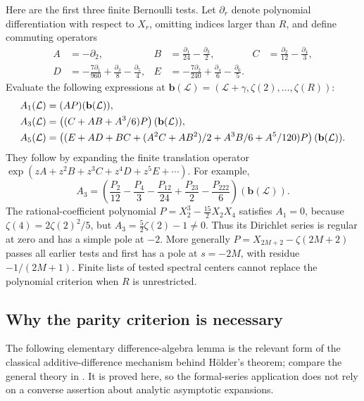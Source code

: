 Here are the first three finite Bernoulli tests. Let $\partial_r$
denote polynomial differentiation with respect to $X_r$, omitting
indices larger than $R$, and define commuting operators
\begin{align*}
 A&=-\partial_2,&
 B&=\frac{\partial_1}{24}-\frac{\partial_3}{2},&
 C&=\frac{\partial_2}{12}-\frac{\partial_4}{3},\\
 D&=-\frac{7\partial_1}{960}+\frac{\partial_3}{8}
                    -\frac{\partial_5}{4},&
 E&=-\frac{7\partial_2}{240}+\frac{\partial_4}{6}
                    -\frac{\partial_6}{5}.
\end{align*}
Evaluate the following expressions at
$\mathbf b(\mathcal L)=(\mathcal L+\gamma,\zeta(2),\ldots,\zeta(R))$:
\begin{align}
 A_1(\mathcal L)&=(AP)(\mathbf b(\mathcal L)),\notag\\
 A_3(\mathcal L)&=\left((C+AB+A^3/6)P\right)(\mathbf b(\mathcal L)),\label{hc:first-tests}\\
 A_5(\mathcal L)&=\left((E+AD+BC+(A^2C+AB^2)/2
                   +A^3B/6+A^5/120)P\right)(\mathbf b(\mathcal L)).\notag
\end{align}
They follow by expanding the finite translation operator
$\exp(zA+z^2B+z^3C+z^4D+z^5E+\cdots)$.
For example,
\[
 A_3=\left(\frac{P_2}{12}-\frac{P_4}{3}
   -\frac{P_{12}}{24}+\frac{P_{23}}2-\frac{P_{222}}6\right)(\mathbf b(\mathcal L)).
\]
The rational-coefficient polynomial
$P=X_2^3-\tfrac{15}{2}X_2X_4$ satisfies $A_1=0$, because
$\zeta(4)=2\zeta(2)^2/5$, but
$A_3=\tfrac52\zeta(2)-1\ne0$. Thus its Dirichlet series is regular
at zero and has a simple pole at $-2$. More generally
$P=X_{2M+2}-\zeta(2M+2)$ passes all earlier tests and first has a
pole at $s=-2M$, with residue $-1/(2M+1)$. Finite lists of tested
spectral centers cannot replace the polynomial criterion when $R$
is unrestricted.

\subsection{Why the parity criterion is necessary}

The following elementary difference-algebra lemma is the relevant
form of the classical additive-difference mechanism behind
H\"older's theorem; compare the general theory in \cite{HardouinSinger}. It is proved here, so the formal-series application
does not rely on a converse assertion about analytic asymptotic
expansions.

